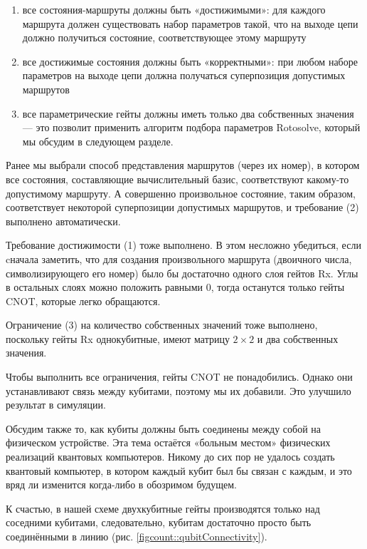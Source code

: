 \begin{enumerate}
    \item все состояния-маршруты должны быть «достижимыми»: для каждого маршрута должен существовать набор параметров такой, что на выходе цепи должно получиться состояние, соответствующее этому маршруту 

    \item все достижимые состояния должны быть «корректными»: при любом наборе параметров на выходе цепи должна получаться суперпозиция допустимых маршрутов
    
    \item все параметрические гейты должны иметь только два собственных значения --- это позволит применить алгоритм подбора параметров Rotosolve, который мы обсудим в следующем разделе.
\end{enumerate}


Ранее мы выбрали способ представления маршрутов (через их номер), в котором все состояния, составляющие вычислительный базис, соответствуют какому-то допустимому маршруту. А совершенно произвольное состояние, таким образом, соответствует некоторой суперпозиции допустимых маршрутов, и требование (2) выполнено автоматически.

Требование достижимости (1) тоже выполнено. В этом несложно убедиться, если cначала заметить, что для создания произвольного маршрута (двоичного числа, символизирующего его номер) было бы достаточно одного слоя гейтов Rx. Углы в остальных слоях можно положить равными 0, тогда останутся только гейты CNOT, которые легко обращаются.

Ограничение (3) на количество собственных значений тоже выполнено, поскольку гейты Rx 
однокубитные, имеют матрицу $2 \times 2$ и два собственных значения.

Чтобы выполнить все ограничения, гейты CNOT не понадобились. Однако они устанавливают связь между кубитами, поэтому мы их добавили. Это улучшило результат в симуляции.

Обсудим также то, как кубиты должны быть соединены между собой на физическом устройстве. 
Эта тема остаётся «больным местом» 
физических реализаций квантовых компьютеров. Никому до сих пор не удалось создать квантовый компьютер, в котором каждый кубит был бы связан с каждым, и это вряд ли изменится когда-либо в обозримом будущем.

К счастью, в нашей схеме двухкубитные гейты производятся только над соседними кубитами, следовательно, кубитам достаточно просто быть соединёнными в линию (рис. \ref{figcount::qubitConnectivity}).


